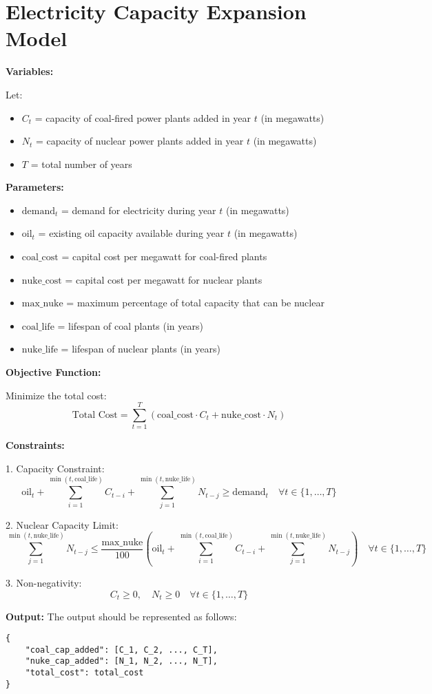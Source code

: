 \documentclass{article}
\begin{document}
\section*{Electricity Capacity Expansion Model}

\textbf{Variables:}

Let:
\begin{itemize}
    \item \( C_t \) = capacity of coal-fired power plants added in year \( t \) (in megawatts)
    \item \( N_t \) = capacity of nuclear power plants added in year \( t \) (in megawatts)
    \item \( T \) = total number of years
\end{itemize}

\textbf{Parameters:}

\begin{itemize}
    \item \( \text{demand}_t \) = demand for electricity during year \( t \) (in megawatts)
    \item \( \text{oil}_t \) = existing oil capacity available during year \( t \) (in megawatts)
    \item \( \text{coal\_cost} \) = capital cost per megawatt for coal-fired plants
    \item \( \text{nuke\_cost} \) = capital cost per megawatt for nuclear plants
    \item \( \text{max\_nuke} \) = maximum percentage of total capacity that can be nuclear
    \item \( \text{coal\_life} \) = lifespan of coal plants (in years)
    \item \( \text{nuke\_life} \) = lifespan of nuclear plants (in years)
\end{itemize}

\textbf{Objective Function:}

Minimize the total cost:
\[
\text{Total Cost} = \sum_{t=1}^{T} (\text{coal\_cost} \cdot C_t + \text{nuke\_cost} \cdot N_t)
\]

\textbf{Constraints:}

1. Capacity Constraint:
\[
\text{oil}_t + \sum_{i=1}^{\min(t, \text{coal\_life})} C_{t-i} + \sum_{j=1}^{\min(t, \text{nuke\_life})} N_{t-j} \geq \text{demand}_t \quad \forall t \in \{1, \ldots, T\}
\]

2. Nuclear Capacity Limit:
\[
\sum_{j=1}^{\min(t, \text{nuke\_life})} N_{t-j} \leq \frac{\text{max\_nuke}}{100} \left( \text{oil}_t + \sum_{i=1}^{\min(t, \text{coal\_life})} C_{t-i} + \sum_{j=1}^{\min(t, \text{nuke\_life})} N_{t-j} \right) \quad \forall t \in \{1, \ldots, T\}
\]

3. Non-negativity:
\[
C_t \geq 0, \quad N_t \geq 0 \quad \forall t \in \{1, \ldots, T\}
\]

\textbf{Output:}
The output should be represented as follows:
\begin{verbatim}
{
    "coal_cap_added": [C_1, C_2, ..., C_T],
    "nuke_cap_added": [N_1, N_2, ..., N_T],
    "total_cost": total_cost
}
\end{verbatim}
\end{document}
